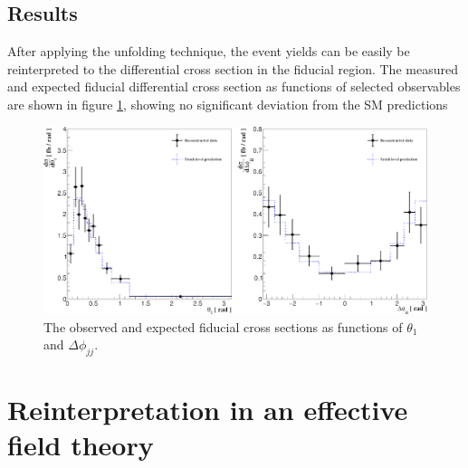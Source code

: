 \documentclass[a4paper,12pt]{article}
\begin{document}
		\subsection{Results}
			\par After applying the unfolding technique, the event yields can be easily be reinterpreted to the differential cross section
			in the fiducial region. The measured and expected fiducial differential cross section as functions of selected observables are shown in figure \ref{fig:diffxs}, showing no significant deviation from the SM predictions
			\begin{figure}[ht]
				\begin{centering}
				\includegraphics[scale=0.664]{figures/diffxs.png}
				\caption{The observed and expected fiducial cross sections as functions of $\theta_1$ and $\Delta\phi_{jj}$.}
				\label{fig:diffxs}
				\end{centering}
			\end{figure}
	\section{Reinterpretation in an effective field theory} \label{sec:eft}
\end{document}
